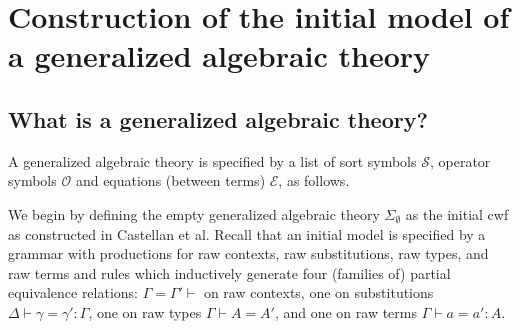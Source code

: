 \documentclass{lmcs}
\begin{document}
\section{Construction of the initial model of a generalized algebraic theory}

\def\Sort{\mathcal{S}}
\def\Op{\mathcal{O}}
\def\Eq{\mathcal{E}}

\subsection{What is a generalized algebraic theory?}

A generalized algebraic theory is specified by a list of sort symbols $\Sort$, operator symbols $\Op$ and equations (between terms) $\Eq$, as follows.

We begin by defining the empty generalized algebraic theory $\Sigma_\emptyset$ as the initial cwf as constructed in Castellan et al. Recall that an initial model is specified by a grammar with productions for raw contexts, raw substitutions, raw types, and raw terms and rules which inductively generate four (families of) partial equivalence relations: $\Gamma = \Gamma' \vdash$ on raw contexts, one on substitutions $\Delta \vdash \gamma = \gamma' : \Gamma$, one on raw types $\Gamma \vdash A = A'$, and one on raw terms $\Gamma \vdash a = a' : A$. 
\end{document}
